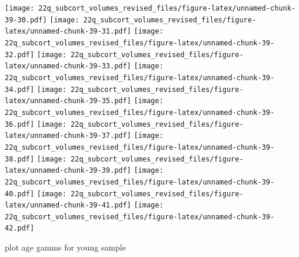 \documentclass[
]{article}
\begin{document}
\texttt{[image: 22q\_subcort\_volumes\_revised\_files/figure-latex/unnamed-chunk-39-30.pdf]}
\texttt{[image: 22q\_subcort\_volumes\_revised\_files/figure-latex/unnamed-chunk-39-31.pdf]}
\texttt{[image: 22q\_subcort\_volumes\_revised\_files/figure-latex/unnamed-chunk-39-32.pdf]}
\texttt{[image: 22q\_subcort\_volumes\_revised\_files/figure-latex/unnamed-chunk-39-33.pdf]}
\texttt{[image: 22q\_subcort\_volumes\_revised\_files/figure-latex/unnamed-chunk-39-34.pdf]}
\texttt{[image: 22q\_subcort\_volumes\_revised\_files/figure-latex/unnamed-chunk-39-35.pdf]}
\texttt{[image: 22q\_subcort\_volumes\_revised\_files/figure-latex/unnamed-chunk-39-36.pdf]}
\texttt{[image: 22q\_subcort\_volumes\_revised\_files/figure-latex/unnamed-chunk-39-37.pdf]}
\texttt{[image: 22q\_subcort\_volumes\_revised\_files/figure-latex/unnamed-chunk-39-38.pdf]}
\texttt{[image: 22q\_subcort\_volumes\_revised\_files/figure-latex/unnamed-chunk-39-39.pdf]}
\texttt{[image: 22q\_subcort\_volumes\_revised\_files/figure-latex/unnamed-chunk-39-40.pdf]}
\texttt{[image: 22q\_subcort\_volumes\_revised\_files/figure-latex/unnamed-chunk-39-41.pdf]}
\texttt{[image: 22q\_subcort\_volumes\_revised\_files/figure-latex/unnamed-chunk-39-42.pdf]}

plot age gamms for young sample
\end{document}
